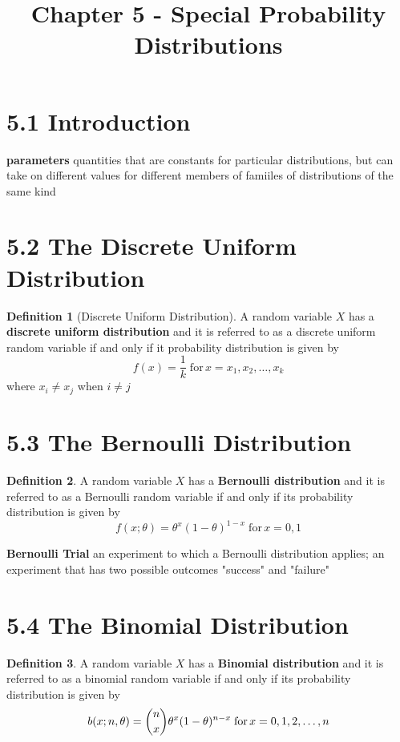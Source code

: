 \documentclass[
10pt,reqno
]{amsart}
\title{Chapter 5 - Special Probability Distributions}
\theoremstyle{definition}
\newtheorem{definition}{Definition}[section]
\begin{document}
\maketitle


\section*{5.1 Introduction}

\textbf{parameters} quantities that are constants for particular distributions, but can take on different values for different members of famiiles of distributions of the same kind

\section*{5.2 The Discrete Uniform Distribution}

\begin{definition}[Discrete Uniform Distribution]
A random variable \(X\) has a \textbf{discrete uniform distribution} and it is referred to as a discrete uniform random variable if and only if it probability distribution is given by
\[
f(x) = \frac{1}{k} \; \text{for} \, x = x_1, x_2, \dots, x_k
\]
where \(x_i \ne x_j\) when \(i \ne j\)
\end{definition}

\section*{5.3 The Bernoulli Distribution}

\begin{definition}
A random variable \(X\) has a \textbf{Bernoulli distribution} and it is referred to as a Bernoulli random variable if and only if its probability distribution is given by
\[
f(x; \theta) = \theta ^x (1-\theta)^{1-x} \; \text{for} \, x=0,1
\]
\end{definition}

\textbf{Bernoulli Trial} an experiment to which a Bernoulli distribution applies; an experiment that has two possible outcomes "success" and "failure"

\section*{5.4 The Binomial Distribution}

\begin{definition}
A random variable \(X\) has a \textbf{Binomial distribution} and it is referred to as a binomial random variable if and only if its probability distribution is given by
\[
b(x; n, \theta)= \dbinom n x \theta^x (1-\theta)^{n-x} \; \text{for} \, x=0,1,2,\dots,n
\]
\end{definition}
\end{document}
